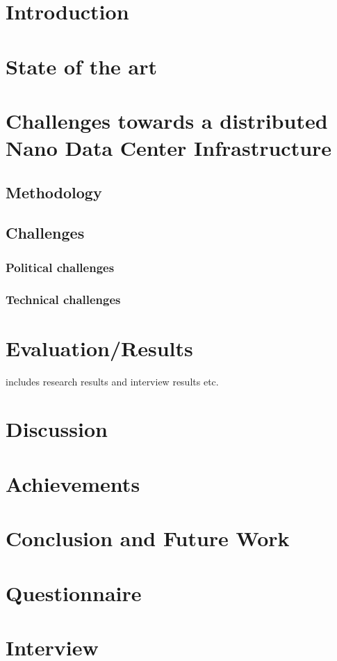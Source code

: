 
\section{Introduction}


\section{State of the art}


\section{Challenges towards a distributed Nano Data Center Infrastructure}

\subsection{Methodology}

\subsection{Challenges}

\subsubsection{Political challenges}

\subsubsection{Technical challenges}


\section{Evaluation/Results}

includes research results and interview results etc.

\section{Discussion}

\section{Achievements}

\section{Conclusion and Future Work}

\begin{acks}

\end{acks}




\appendix
\section{Questionnaire}

\section{Interview}
